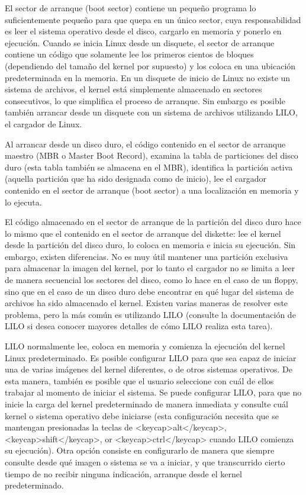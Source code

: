 \documentclass[12pt]{article}
\begin{document}
 El sector de arranque (boot sector) contiene un pequeño programa lo
suficientemente pequeño para que quepa en un único sector, cuya responsabilidad
es leer el sistema operativo desde el disco, cargarlo en memoria y ponerlo en
ejecución. Cuando se inicia Linux desde un disquete, el sector de arranque
contiene un código que solamente lee los primeros cientos de bloques
(dependiendo del tamaño del kernel por supuesto) y los coloca en una ubicación
predeterminada en la memoria. En un disquete de inicio de Linux no existe un
sistema de archivos, el kernel está simplemente almacenado en sectores
consecutivos, lo que simplifica el proceso de arranque. Sin embargo es posible
también arrancar desde un disquete con un sistema de archivos utilizando LILO,
el cargador de Linux.  


 Al arrancar desde un disco duro, el código contenido en el sector de
arranque maestro (MBR o Master Boot Record), examina la tabla de particiones del
disco duro (esta tabla también se almacena en el MBR), identifica la partición
activa (aquella partición que ha sido designada como de inicio), lee el cargador
contenido en el sector de arranque (boot sector) a una localización en memoria y
lo ejecuta.  

 El código almacenado en el sector de arranque de la partición del disco
duro hace lo mismo que el contenido en el sector de arranque del diskette: lee
el kernel desde la partición del disco duro, lo coloca en memoria e inicia su
ejecución. Sin embargo, existen diferencias. No es muy útil mantener una
partición exclusiva para almacenar la imagen del kernel, por lo tanto el
cargador no se limita a leer de manera secuencial los sectores del disco, como
lo hace en el caso de un floppy, sino que en el caso de un disco duro debe
encontrar en qué lugar del sistema de archivos ha sido almacenado el kernel.
Existen varias maneras de resolver este problema, pero la más común es
utilizando LILO (consulte la documentación de LILO si desea conocer mayores
detalles de cómo LILO realiza esta tarea).  

LILO normalmente lee, coloca en memoria y comienza la ejecución del kernel
Linux predeterminado. Es posible configurar LILO para que sea capaz de iniciar
una de varias imágenes del kernel diferentes, o de otros sistemas operativos. De
esta manera, también es posible que el usuario seleccione con cuál de ellos
trabajar al momento de iniciar el sistema.  Se puede configurar LILO, para que
no inicie la carga del kernel predeterminado de manera inmediata y consulte cuál
kernel o sistema operativo debe iniciarse (esta configuración necesita que se
mantengan presionadas la teclas de <keycap>alt</keycap>, <keycap>shift</keycap>,
or <keycap>ctrl</keycap> cuando LILO comienza su ejecución). Otra opción
consiste en configurarlo de manera que siempre consulte desde qué imagen o
sistema se va a iniciar, y que transcurrido cierto tiempo de no recibir ninguna
indicación, arranque desde el kernel predeterminado.  
\end{document}
